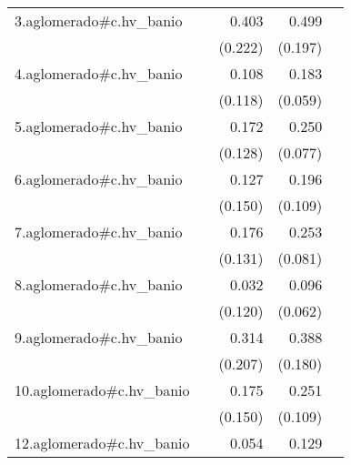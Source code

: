{\begin{longtable}{l*{4}{D{.}{.}{-1}}}
\addlinespace
3.aglomerado#c.hv\_banio&                     &       0.403         &       0.499\sym{*}  &                     \\
            &                     &     (0.222)         &     (0.197)         &                     \\
\addlinespace
4.aglomerado#c.hv\_banio&                     &       0.108         &       0.183\sym{**} &                     \\
            &                     &     (0.118)         &     (0.059)         &                     \\
\addlinespace
5.aglomerado#c.hv\_banio&                     &       0.172         &       0.250\sym{**} &                     \\
            &                     &     (0.128)         &     (0.077)         &                     \\
\addlinespace
6.aglomerado#c.hv\_banio&                     &       0.127         &       0.196         &                     \\
            &                     &     (0.150)         &     (0.109)         &                     \\
\addlinespace
7.aglomerado#c.hv\_banio&                     &       0.176         &       0.253\sym{**} &                     \\
            &                     &     (0.131)         &     (0.081)         &                     \\
\addlinespace
8.aglomerado#c.hv\_banio&                     &       0.032         &       0.096         &                     \\
            &                     &     (0.120)         &     (0.062)         &                     \\
\addlinespace
9.aglomerado#c.hv\_banio&                     &       0.314         &       0.388\sym{*}  &                     \\
            &                     &     (0.207)         &     (0.180)         &                     \\
\addlinespace
10.aglomerado#c.hv\_banio&                     &       0.175         &       0.251\sym{*}  &                     \\
            &                     &     (0.150)         &     (0.109)         &                     \\
\addlinespace
12.aglomerado#c.hv\_banio&                     &       0.054         &       0.129         &                     \\

\end{longtable}}
